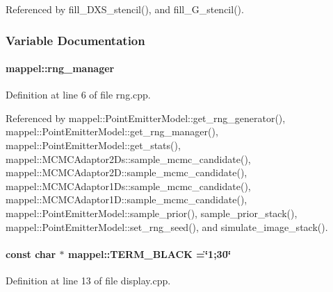 Referenced by fill\+\_\+\+D\+X\+S\+\_\+stencil(), and fill\+\_\+\+G\+\_\+stencil().



\subsubsection{Variable Documentation}
\paragraph[{\texorpdfstring{rng\+\_\+manager}{rng_manager}}]{ mappel\+::rng\+\_\+manager}\hypertarget{namespacemappel_abe2a4321a80f2384995f3c288131d4c0}{}\label{namespacemappel_abe2a4321a80f2384995f3c288131d4c0}


Definition at line 6 of file rng.\+cpp.



Referenced by mappel\+::\+Point\+Emitter\+Model\+::get\+\_\+rng\+\_\+generator(), mappel\+::\+Point\+Emitter\+Model\+::get\+\_\+rng\+\_\+manager(), mappel\+::\+Point\+Emitter\+Model\+::get\+\_\+stats(), mappel\+::\+M\+C\+M\+C\+Adaptor2\+Ds\+::sample\+\_\+mcmc\+\_\+candidate(), mappel\+::\+M\+C\+M\+C\+Adaptor2\+D\+::sample\+\_\+mcmc\+\_\+candidate(), mappel\+::\+M\+C\+M\+C\+Adaptor1\+Ds\+::sample\+\_\+mcmc\+\_\+candidate(), mappel\+::\+M\+C\+M\+C\+Adaptor1\+D\+::sample\+\_\+mcmc\+\_\+candidate(), mappel\+::\+Point\+Emitter\+Model\+::sample\+\_\+prior(), sample\+\_\+prior\+\_\+stack(), mappel\+::\+Point\+Emitter\+Model\+::set\+\_\+rng\+\_\+seed(), and simulate\+\_\+image\+\_\+stack().

\paragraph[{\texorpdfstring{T\+E\+R\+M\+\_\+\+B\+L\+A\+CK}{TERM_BLACK}}]{\setlength{\rightskip}{0pt plus 5cm}const char $\ast$ mappel\+::\+T\+E\+R\+M\+\_\+\+B\+L\+A\+CK =\char`\"{}1;30\char`\"{}}\hypertarget{namespacemappel_a448ca8ea08b3b9cdf522884ac004d901}{}\label{namespacemappel_a448ca8ea08b3b9cdf522884ac004d901}


Definition at line 13 of file display.\+cpp.

